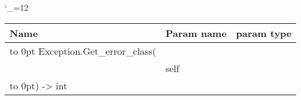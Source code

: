 \begingroup \catcode`\_=12 \tt
\begin{tabular}{lll}
\toprule
\textrm{Name}&\textrm{Param name}&\textrm{param type}\\
\midrule
\hbox to 0pt {Exception.Get_error_class(\hss}\\
& self\\
\hbox to 0pt{) -> int\hss}\\
\bottomrule
\end{tabular}
\endgroup

